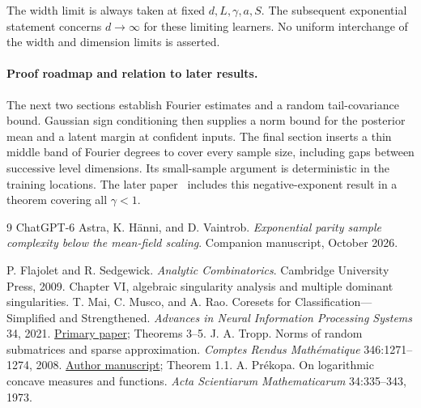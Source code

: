 \documentclass[11pt]{article}
\theoremstyle{remark}\newtheorem{remark}[theorem]{Remark}
\begin{document}
The width limit is always taken at fixed $d,L,\gamma,a,S$. The
subsequent exponential statement concerns $d\to\infty$ for these
limiting learners. No uniform interchange of the width and dimension
limits is asserted.

\paragraph{Proof roadmap and relation to later results.}
The next two sections establish Fourier estimates and a random
tail-covariance bound. Gaussian sign conditioning then supplies a norm
bound for the posterior mean and a latent margin at confident inputs.
The final section inserts a thin middle band of Fourier degrees to
cover every sample size, including gaps between successive level
dimensions. Its small-sample argument is deterministic in the training
locations. The later paper~\cite{subcritical-exponential} includes this
negative-exponent result in a theorem covering all $\gamma<1$.






\begin{thebibliography}{9}
ChatGPT-6 Astra, K. H\"anni, and D. Vaintrob.
\emph{Exponential parity sample complexity below the mean-field scaling}.
Companion manuscript, October 2026.

P. Flajolet and R. Sedgewick.
\emph{Analytic Combinatorics}. Cambridge University Press, 2009.
Chapter VI, algebraic singularity analysis and multiple dominant
singularities.
T. Mai, C. Musco, and A. Rao.
Coresets for Classification---Simplified and Strengthened.
\emph{Advances in Neural Information Processing Systems} 34, 2021.
\href{https://papers.neurips.cc/paper_files/paper/2021/file/6098ed616e715171f0dabad60a8e5197-Paper.pdf}{Primary paper}; Theorems 3--5.
J. A. Tropp.
Norms of random submatrices and sparse approximation.
\emph{Comptes Rendus Math\'ematique} 346:1271--1274, 2008.
\href{https://tropp.caltech.edu/papers/Tro08-Norms-Random-v3.pdf}{Author manuscript}; Theorem 1.1.
A. Pr\'ekopa.
On logarithmic concave measures and functions.
\emph{Acta Scientiarum Mathematicarum} 34:335--343, 1973.
\end{thebibliography}
\end{document}
